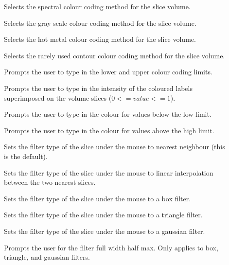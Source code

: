\begin{description}
\item[]  Selects the spectral colour coding
                                          method for the slice volume.
\item[]  Selects the gray scale colour coding
                                          method for the slice volume.
\item[]  Selects the hot metal colour coding
                                          method for the slice volume.
\item[]  Selects the rarely used contour
                                    colour coding method for the slice volume.
\item[]  Prompts the user to type in the lower
                                    and upper colour coding limits.
\item[]  Prompts the user to type in the
                      intensity of the coloured labels superimposed on the 
                      volume slices ($0 <= value <= 1$).
\item[]  Prompts the user to type in
                                   the colour for values below the low limit.
\item[]  Prompts the user to type in
                                   the colour for values above the high limit.
\item[]  Sets the filter type of
                       the slice under the mouse to nearest neighbour (this is
                       the default).
\item[]  Sets the filter type of
                       the slice under the mouse to linear interpolation
                       between the two nearest slices.
\item[]  Sets the filter type of
                       the slice under the mouse to a box filter.
\item[]  Sets the filter type of
                       the slice under the mouse to a triangle filter.
\item[]  Sets the filter type of
                       the slice under the mouse to a gaussian filter.
\item[]  Prompts the user for
                      the filter full width half max.  Only applies to box,
                      triangle, and gaussian filters.
\end{description}


